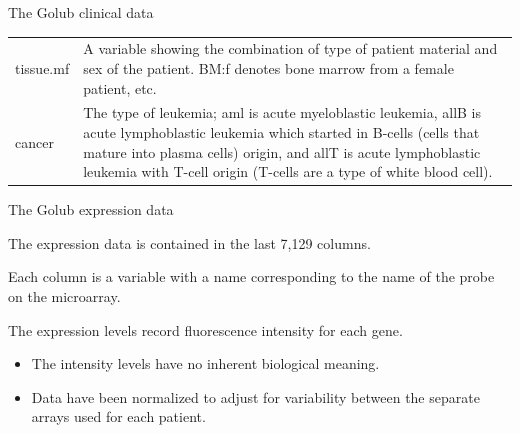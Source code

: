 \documentclass[10pt]{beamer}\usepackage[]{graphicx}\usepackage[]{color}
\begin{document}
\begin{frame}{The Golub clinical data}
\begin{longtable}[]{@{}ll@{}}
								\begin{minipage}[t]{0.12\columnwidth}\raggedright
									tissue.mf\strut
								\end{minipage} & \begin{minipage}[t]{0.82\columnwidth}\raggedright
									A variable showing the combination of type of patient material and sex
									of the patient. BM:f denotes bone marrow from a female patient,
									etc.\strut
								\end{minipage}\tabularnewline
								\begin{minipage}[t]{0.12\columnwidth}\raggedright
									cancer\strut
								\end{minipage} & \begin{minipage}[t]{0.82\columnwidth}\raggedright
									The type of leukemia; aml is acute myeloblastic leukemia, allB is acute
									lymphoblastic leukemia which started in B-cells (cells that mature into
									plasma cells) origin, and allT is acute lymphoblastic leukemia with
									T-cell origin (T-cells are a type of white blood cell).\strut
								\end{minipage}\tabularnewline
								\bottomrule
							\end{longtable}
							
						\end{frame}
						
						\begin{frame}{The Golub expression data}
							\protect\hypertarget{the-golub-expression-data}{}
							
							The expression data is contained in the last 7,129 columns.
							
							Each column is a variable with a name corresponding to the name of the
							probe on the microarray.
							
							The expression levels record fluorescence intensity for each gene.
							
							\begin{itemize}
								\item
								The intensity levels have no inherent biological meaning.
								\item
								Data have been normalized to adjust for variability between the
								separate arrays used for each patient.
							\end{itemize}
							
						\end{frame}
						
\end{document}
